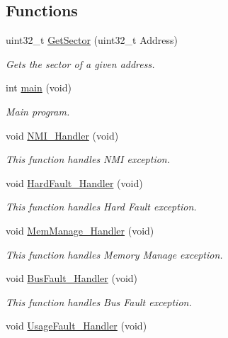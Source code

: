 \subsection*{Functions}
\begin{DoxyCompactItemize}
\item 
uint32\-\_\-t \hyperlink{group___f_l_a_s_h___program_ga90db73e2ffb962de6891c783f62db0d0}{Get\-Sector} (uint32\-\_\-t Address)
\begin{DoxyCompactList}\small\item\em Gets the sector of a given address. \end{DoxyCompactList}\item 
int \hyperlink{group___f_l_a_s_h___program_ga840291bc02cba5474a4cb46a9b9566fe}{main} (void)
\begin{DoxyCompactList}\small\item\em Main program. \end{DoxyCompactList}\item 
void \hyperlink{group___f_l_a_s_h___program_ga6ad7a5e3ee69cb6db6a6b9111ba898bc}{N\-M\-I\-\_\-\-Handler} (void)
\begin{DoxyCompactList}\small\item\em This function handles N\-M\-I exception. \end{DoxyCompactList}\item 
void \hyperlink{group___f_l_a_s_h___program_ga2bffc10d5bd4106753b7c30e86903bea}{Hard\-Fault\-\_\-\-Handler} (void)
\begin{DoxyCompactList}\small\item\em This function handles Hard Fault exception. \end{DoxyCompactList}\item 
void \hyperlink{group___f_l_a_s_h___program_ga3150f74512510287a942624aa9b44cc5}{Mem\-Manage\-\_\-\-Handler} (void)
\begin{DoxyCompactList}\small\item\em This function handles Memory Manage exception. \end{DoxyCompactList}\item 
void \hyperlink{group___f_l_a_s_h___program_ga850cefb17a977292ae5eb4cafa9976c3}{Bus\-Fault\-\_\-\-Handler} (void)
\begin{DoxyCompactList}\small\item\em This function handles Bus Fault exception. \end{DoxyCompactList}\item 
void \hyperlink{group___f_l_a_s_h___program_ga1d98923de2ed6b7309b66f9ba2971647}{Usage\-Fault\-\_\-\-Handler} (void)

\end{DoxyCompactItemize}
